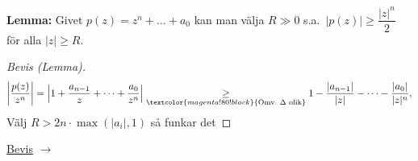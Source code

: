 \textbf{Lemma:} Givet $p(z) = z^n + \dots + a_0$ kan man välja $R \gg 0$ s.a.\ $|p(z)| \ge \dfrac{|z|^n}{2}$ för alla $|z| \ge R$.

\begin{proof}[Bevis (Lemma)]
\[ \left| \frac{p(z)}{z^n} \right| = \left| 1 + \frac{a_{n-1}}{z} + \dots + \frac{a_0}{z^n} \right| \underset{\textcolor{magenta!80!black}{\text{Omv.\ } \Delta\text{ olik}}}{\ge} 1 - \frac{|a_{n-1}|}{|z|} - \dots - \frac{|a_0|}{|z|^n}, \]
Välj $R > 2n \cdot \max(|a_i|, 1)$ så funkar det
\end{proof}

\hfill \textcolor{red!70!black}{\underline{Bevis}} $\rightarrow$
